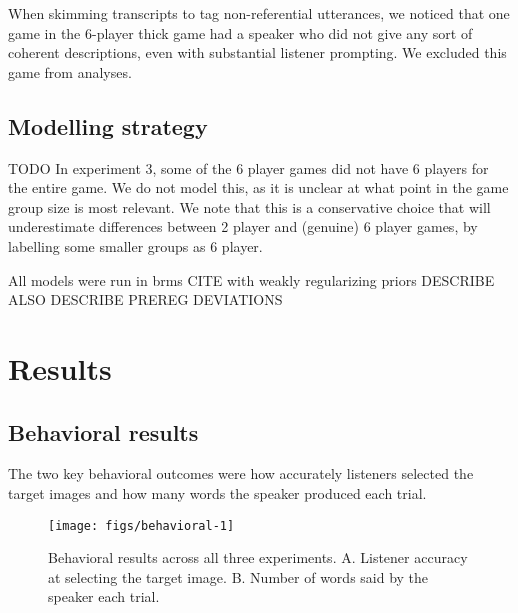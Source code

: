 \documentclass[
  english,
  a4paper,
]{article}
\begin{document}
When skimming transcripts to tag non-referential utterances, we noticed that one game in the 6-player thick game had a speaker who did not give any sort of coherent descriptions, even with substantial listener prompting. We excluded this game from analyses.

\hypertarget{modelling-strategy}{%
\subsection{Modelling strategy}\label{modelling-strategy}}

TODO
In experiment 3, some of the 6 player games did not have 6 players for the entire game. We do not model this, as it is unclear at what point in the game group size is most relevant. We note that this is a conservative choice that will underestimate differences between 2 player and (genuine) 6 player games, by labelling some smaller groups as 6 player.

All models were run in brms CITE with weakly regularizing priors DESCRIBE ALSO DESCRIBE PREREG DEVIATIONS

\hypertarget{results}{%
\section{Results}\label{results}}

\hypertarget{behavioral-results}{%
\subsection{Behavioral results}\label{behavioral-results}}

The two key behavioral outcomes were how accurately listeners selected the target images and how many words the speaker produced each trial.

\begin{figure*}[t!]

{\centering \texttt{[image: figs/behavioral-1]} 

}

\caption{Behavioral results across all three experiments.  A. Listener accuracy at selecting the target image. B. Number of words said by the speaker each trial. }\label{fig:behavioral}
\end{figure*}
\end{document}
